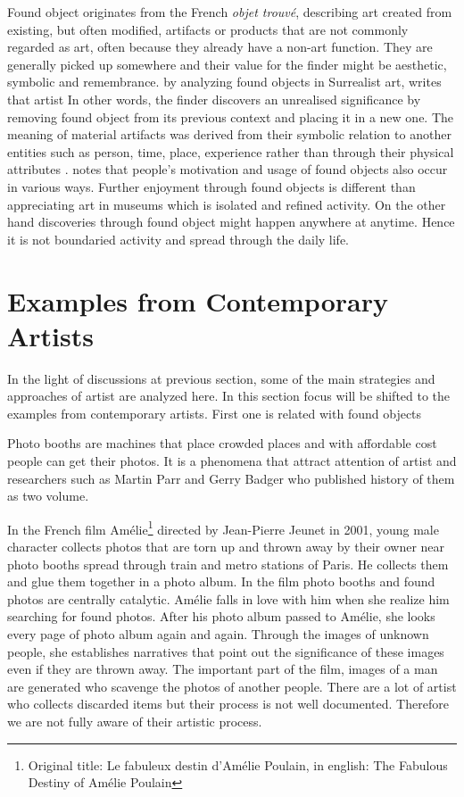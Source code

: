 Found object originates from the French \textit{objet trouvé}, describing art created from existing, but often modified, artifacts or products that are not commonly regarded as art, often because they already have a non-art function. They are generally picked up somewhere and their value for the finder might be aesthetic, symbolic and remembrance. \cite[170]{gascoyne1936short} by analyzing found objects in Surrealist art, writes that artist  In other words, the finder discovers an unrealised significance by removing found object from its previous context and placing it in a new one. The meaning of material artifacts was derived from their symbolic relation to another entities such as person, time, place, experience rather than through their physical attributes \citep{camic2010trashed}. \cite{camic2010trashed} notes that people's motivation and usage of found objects also occur in various ways. Further enjoyment through found objects is different than appreciating art in museums which is isolated and refined activity. On the other hand discoveries through found object might happen anywhere at anytime. Hence it is not boundaried activity and spread through the daily life.



\section{Examples from Contemporary Artists}
In the light of discussions at previous section, some of the main strategies and approaches of artist are analyzed here. In this section focus will be shifted to the examples from contemporary artists. First one is related with found objects

Photo booths are machines that place crowded places and with affordable cost people can get their photos. It is a phenomena that attract attention of artist and researchers such as Martin Parr and Gerry Badger who published history of them as two volume.

In the French film Amélie\footnote{Original title: Le fabuleux destin d'Amélie Poulain, in english: The Fabulous Destiny of Amélie Poulain} directed by Jean-Pierre Jeunet in 2001, young male character collects photos that are torn up and thrown away by their owner near photo booths spread through train and metro stations of Paris. He collects them and glue them together in a photo album. In the film photo booths and found photos are centrally catalytic. Amélie falls in love with him when she realize him searching for found photos. After his photo album passed to Amélie, she looks every page of photo album again and again. Through the images of unknown people, she establishes narratives that point out the significance of these images even if they are thrown away. The important part of the film, images of a man are generated who scavenge the photos of another people. There are a lot of artist who collects discarded items but their process is not well documented. Therefore we are not fully aware of their artistic process. 


